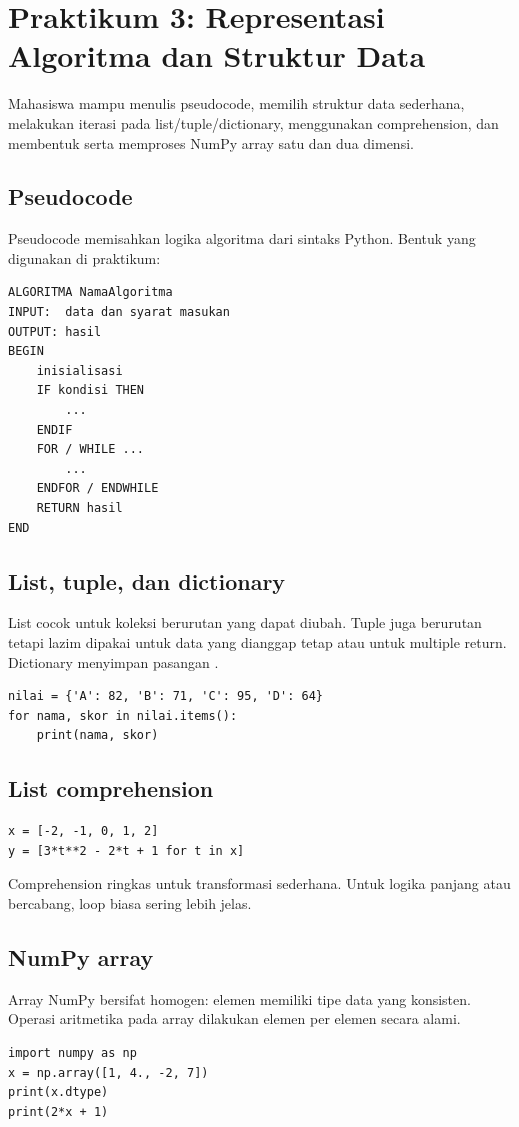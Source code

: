 \documentclass[11pt,a4paper]{report}
\newcommand{\kode}[1]{\texttt{\detokenize{#1}}}
\begin{document}
\chapter{Praktikum 3: Representasi Algoritma dan Struktur Data}
\begin{tujuanbox}
Mahasiswa mampu menulis pseudocode, memilih struktur data sederhana, melakukan iterasi pada list/tuple/dictionary, menggunakan comprehension, dan membentuk serta memproses NumPy array satu dan dua dimensi.
\end{tujuanbox}

\section{Pseudocode}
Pseudocode memisahkan logika algoritma dari sintaks Python. Bentuk yang digunakan di praktikum:
\begin{lstlisting}[language={}]
ALGORITMA NamaAlgoritma
INPUT:  data dan syarat masukan
OUTPUT: hasil
BEGIN
    inisialisasi
    IF kondisi THEN
        ...
    ENDIF
    FOR / WHILE ...
        ...
    ENDFOR / ENDWHILE
    RETURN hasil
END
\end{lstlisting}

\section{List, tuple, dan dictionary}
List cocok untuk koleksi berurutan yang dapat diubah. Tuple juga berurutan tetapi lazim dipakai untuk data yang dianggap tetap atau untuk multiple return. Dictionary menyimpan pasangan \kode{key:value}.

\begin{lstlisting}
nilai = {'A': 82, 'B': 71, 'C': 95, 'D': 64}
for nama, skor in nilai.items():
    print(nama, skor)
\end{lstlisting}

\section{List comprehension}
\begin{lstlisting}
x = [-2, -1, 0, 1, 2]
y = [3*t**2 - 2*t + 1 for t in x]
\end{lstlisting}
Comprehension ringkas untuk transformasi sederhana. Untuk logika panjang atau bercabang, loop biasa sering lebih jelas.

\section{NumPy array}
Array NumPy bersifat homogen: elemen memiliki tipe data yang konsisten. Operasi aritmetika pada array dilakukan elemen per elemen secara alami.
\begin{lstlisting}
import numpy as np
x = np.array([1, 4., -2, 7])
print(x.dtype)
print(2*x + 1)
\end{lstlisting}
\end{document}
